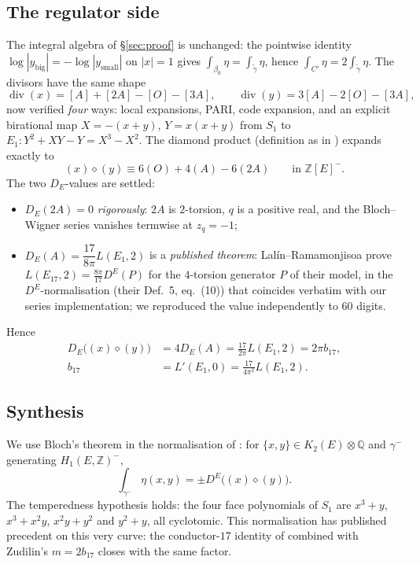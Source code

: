 \documentclass[11pt]{amsart}
\theoremstyle{definition}
\theoremstyle{remark}
\newcommand{\Q}{\mathbb{Q}}
\newcommand{\Z}{\mathbb{Z}}
\DeclareMathOperator{\divisor}{div}
\begin{document}
\subsection{The regulator side}

The integral algebra of \S\ref{sec:proof} is unchanged: the pointwise
identity $\log|y_{\mathrm{big}}|=-\log|y_{\mathrm{small}}|$ on $|x|=1$ gives
$\int_{\beta_0}\eta=\int_{\tilde\gamma}\eta$, hence
$\int_{C'}\eta=2\int_{\tilde\gamma}\eta$. The divisors have the same shape
\[
  \divisor(x)=[A]+[2A]-[O]-[3A],\qquad
  \divisor(y)=3[A]-2[O]-[3A],
\]
now verified \emph{four} ways: local expansions, PARI, code expansion, and an
explicit birational map $X=-(x+y)$, $Y=x(x+y)$ from $S_1$ to
$E_1:Y^2+XY-Y=X^3-X^2$. The diamond product (definition as in \cite{LSZ})
expands exactly to
\[
  (x)\diamond(y)\equiv 6(O)+4(A)-6(2A)\qquad\text{in }\Z[E]^-.
\]
The two $D_E$-values are settled:
\begin{itemize}
  \item $D_E(2A)=0$ \emph{rigorously}: $2A$ is $2$-torsion, $q$ is a positive
  real, and the Bloch--Wigner series vanishes termwise at $z_q=-1$;
  \item $D_E(A)=\dfrac{17}{8\pi}L(E_1,2)$ is a \emph{published theorem}:
  Lal\'in--Ramamonjisoa \cite[\S5]{LalinRam} prove
  $L(E_{17},2)=\frac{8\pi}{17}D^E(P)$ for the $4$-torsion generator $P$ of
  their model, in the $D^E$-normalisation (their Def.~5, eq.~(10)) that
  coincides verbatim with our series implementation; we reproduced the value
  independently to $60$ digits.
\end{itemize}
Hence
\[
\begin{aligned}
  D_E\big((x)\diamond(y)\big)&=4D_E(A)=\frac{17}{2\pi}L(E_1,2)=2\pi b_{17},\\
  b_{17}&=L'(E_1,0)=\frac{17}{4\pi^2}L(E_1,2).
\end{aligned}
\]

\subsection{Synthesis}

We use Bloch's theorem in the normalisation of \cite[Thm.~6]{LalinRam}: for
$\{x,y\}\in K_2(E)\otimes\Q$ and $\gamma^-$ generating $H_1(E,\Z)^-$,
\[
  \int_{\gamma^-}\eta(x,y)=\pm D^E\big((x)\diamond(y)\big).
\]
The temperedness hypothesis holds: the four face polynomials of $S_1$ are
$x^3+y$, $x^3+x^2y$, $x^2y+y^2$ and $y^2+y$, all cyclotomic. This
normalisation has published precedent on this very
curve: the conductor-$17$ identity of \cite{LalinRam} combined with
Zudilin's $m=2b_{17}$ closes with the same factor.
\end{document}

